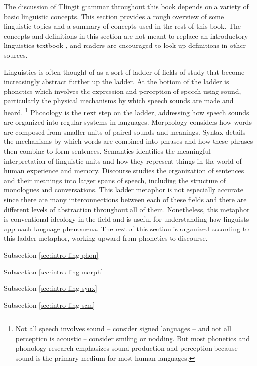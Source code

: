 The discussion of Tlingit grammar throughout this book depends on a variety of basic linguistic concepts.
This section provides a rough overview of some linguistic topics and a summary of concepts used in the rest of this book.
The concepts and definitions in this section are not meant to replace an introductory linguistics textbook \parencites[e.g.][]{fromkin-et-al:2000}{radford-atkinson-britain-etc:2009}{yule:2010}{fromkin-rodman-hyams:2014}{anderson:2018}, and readers are encouraged to look up definitions in other sources.

Linguistics is often thought of as a sort of ladder of fields of study that become increasingly abstract further up the ladder.
At the bottom of the ladder is phonetics which involves the expression and perception of speech using sound, particularly the physical mechanisms by which speech sounds are made and heard.%
\footnote{Not all speech involves sound – consider signed languages – and not all perception is acoustic – consider smiling or nodding. But most phonetics and phonology research emphasizes sound production and perception because sound is the primary medium for most human languages.}
Phonology is the next step on the ladder, addressing how speech sounds are organized into regular systems in languages.
Morphology considers how words are composed from smaller units of paired sounds and meanings.
Syntax details the mechanisms by which words are combined into phrases and how these phrases then combine to form sentences.
Semantics identifies the meaningful interpretation of linguistic units and how they represent things in the world of human experience and memory.
Discourse studies the organization of sentences and their meanings into larger spans of speech, including the structure of monologues and conversations.
This ladder metaphor is not especially accurate since there are many interconnections between each of these fields and there are different levels of abstraction throughout all of them.
Nonetheless, this metaphor is conventional ideology in the field and is useful for understanding how linguists approach language phenomena.
The rest of this section is organized according to this ladder metaphor, working upward from phonetics to discourse.

Subsection \ref{sec:intro-ling-phon} 

Subsection \ref{sec:intro-ling-morph}

Subsection \ref{sec:intro-ling-synx}

Subsection \ref{sec:intro-ling-sem}

